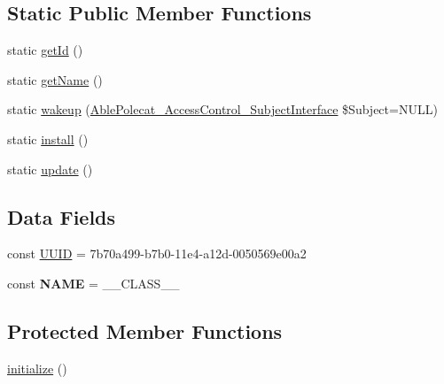 \subsection*{Static Public Member Functions}
\begin{DoxyCompactItemize}
\item 
static \hyperlink{class_able_polecat___registry___class_acfaa3a96d0cb5a4c0d4d710dcba41e9e}{get\+Id} ()
\item 
static \hyperlink{class_able_polecat___registry___class_a4ef9bd37ba3ce8a13c1e8bcf4f72a630}{get\+Name} ()
\item 
static \hyperlink{class_able_polecat___registry___class_a3f2135f6ad45f51d075657f6d20db2cd}{wakeup} (\hyperlink{interface_able_polecat___access_control___subject_interface}{Able\+Polecat\+\_\+\+Access\+Control\+\_\+\+Subject\+Interface} \$Subject=N\+U\+L\+L)
\item 
static \hyperlink{class_able_polecat___registry___class_a7ee9452dbd39de4bfbe7a6dd9ed7bb65}{install} ()
\item 
static \hyperlink{class_able_polecat___registry___class_a00ce4d238d0651db584337f8e0b38c68}{update} ()
\end{DoxyCompactItemize}
\subsection*{Data Fields}
\begin{DoxyCompactItemize}
\item 
const \hyperlink{class_able_polecat___registry___class_a74b892c8c0b86bf9d04c5819898c51e7}{U\+U\+I\+D} = \textquotesingle{}7b70a499-\/b7b0-\/11e4-\/a12d-\/0050569e00a2\textquotesingle{}
\item 
\hypertarget{class_able_polecat___registry___class_a244352f035b82b20b0efa506167fd862}{}const {\bfseries N\+A\+M\+E} = \+\_\+\+\_\+\+C\+L\+A\+S\+S\+\_\+\+\_\+\label{class_able_polecat___registry___class_a244352f035b82b20b0efa506167fd862}

\end{DoxyCompactItemize}
\subsection*{Protected Member Functions}
\begin{DoxyCompactItemize}
\item 
\hyperlink{class_able_polecat___registry___class_a91098fa7d1917ce4833f284bbef12627}{initialize} ()
\end{DoxyCompactItemize}

